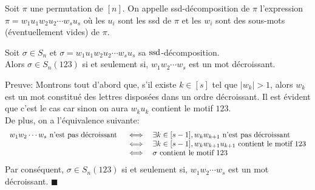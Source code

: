 \begin{definition}
	\begin{rm}
		Soit $\pi$ une permutation de $[n]$. On appelle ssd-décomposition de $\pi$ l'expression $\pi = w_{1}u_{1}w_{2}u_2 \cdots w_{s}u_{s}$ où les $u_{i}$ sont les ssd de $\pi$ et les $w_{i}$ sont des sous-mots (éventuellement vides)  de $\pi$.
	\end{rm}
\end{definition}
\begin{lemme}
	Soit $\sigma \in S_{n}$ et $\sigma = w_{1}u_{1}w_{2}u_2 \cdots w_{s}u_{s}$ sa $\rm{ssd}$-décomposition. \\
	Alors $\sigma \in S_{n}(123)$ si et seulement si, $w_{1}w_{2}\cdots w_{s}$ est un mot décroissant.
\end{lemme}
Preuve:
Montrons tout d'abord que, s'il existe $k\in [s]$ tel que $|w_{k}|>1$, alors $w_{k}$ est un mot constitué des lettres disposées dans un ordre décroissant. Il est évident que c'est le cas car sinon on aura $w_{k}u_{k}$ contient le motif $123$.\\
De plus, on a l'équivalence suivante:
\[
	\begin{array} {l l l}
		w_{1}w_{2}\cdots w_{s} \text{ n'est pas décroissant } & \iff & \exists k \in [s - 1], w_{k} w_{k+1} 
		\text{ n'est pas décroissant }\\
		& \iff & \exists k \in [s - 1], w_{k} w_{k+1} u_{k+1} \text{ contient le motif } 123\\
		& \iff & \sigma \text{ contient le motif } 123\\
	\end{array}
\]
Par conséquent, $\sigma \in S_{n}(123)$ si et seulement si, $w_{1}w_{2}\cdots w_{s}$ est un mot décroissant. $\blacksquare$

